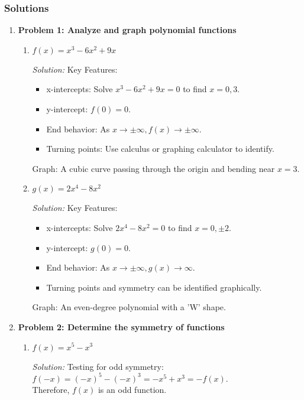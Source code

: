 \documentclass[a4paper,12pt]{book}
\newenvironment{solution}[1][]
{\par\noindent\textit{Solution:} \rmfamily}{\medskip}
\begin{document}
\subsubsection*{Solutions}
\begin{enumerate}
    \item \textbf{Problem 1: Analyze and graph polynomial functions}
    \begin{enumerate}[label=(\alph*)]
        \item \( f(x) = x^3 - 6x^2 + 9x \)
        \begin{solution}
        Key Features:
        \begin{itemize}
            \item x-intercepts: Solve \( x^3 - 6x^2 + 9x = 0 \) to find \( x = 0, 3 \).
            \item y-intercept: \( f(0) = 0 \).
            \item End behavior: As \( x \rightarrow \pm \infty, f(x) \rightarrow \pm \infty \).
            \item Turning points: Use calculus or graphing calculator to identify.
        \end{itemize}
        Graph: A cubic curve passing through the origin and bending near \( x = 3 \).
        \end{solution}

        \item \( g(x) = 2x^4 - 8x^2 \)
        \begin{solution}
        Key Features:
        \begin{itemize}
            \item x-intercepts: Solve \( 2x^4 - 8x^2 = 0 \) to find \( x = 0, \pm 2 \).
            \item y-intercept: \( g(0) = 0 \).
            \item End behavior: As \( x \rightarrow \pm \infty, g(x) \rightarrow \infty \).
            \item Turning points and symmetry can be identified graphically.
        \end{itemize}
        Graph: An even-degree polynomial with a 'W' shape.
        \end{solution}
    \end{enumerate}

    \item \textbf{Problem 2: Determine the symmetry of functions}
    \begin{enumerate}[label=(\alph*)]
        \item \( f(x) = x^5 - x^3 \)
        \begin{solution}
        Testing for odd symmetry: \( f(-x) = (-x)^5 - (-x)^3 = -x^5 + x^3 = -f(x) \).\\
        Therefore, \( f(x) \) is an odd function.
        \end{solution}


\end{enumerate}
\end{enumerate}
\end{document}
